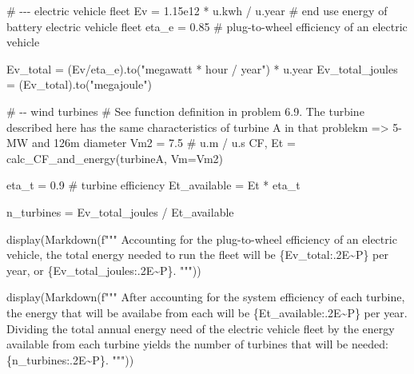 \documentclass[
  letterpaper,
  DIV=11,
  numbers=noendperiod]{scrartcl}
\newenvironment{Shaded}{\begin{snugshade}}{\end{snugshade}}
\newcommand{\CommentTok}[1]{\textcolor[rgb]{0.37,0.37,0.37}{#1}}
\newcommand{\ErrorTok}[1]{\textcolor[rgb]{0.68,0.00,0.00}{#1}}
\newcommand{\FloatTok}[1]{\textcolor[rgb]{0.68,0.00,0.00}{#1}}
\newcommand{\NormalTok}[1]{\textcolor[rgb]{0.00,0.23,0.31}{#1}}
\newcommand{\OperatorTok}[1]{\textcolor[rgb]{0.37,0.37,0.37}{#1}}
\newcommand{\SpecialCharTok}[1]{\textcolor[rgb]{0.37,0.37,0.37}{#1}}
\newcommand{\SpecialStringTok}[1]{\textcolor[rgb]{0.13,0.47,0.30}{#1}}
\newcommand{\StringTok}[1]{\textcolor[rgb]{0.13,0.47,0.30}{#1}}
\begin{document}
\begin{Shaded}
\begin{Highlighting}[]
\CommentTok{\# {-}{-}{-} electric vehicle fleet }
\NormalTok{Ev }\OperatorTok{=} \FloatTok{1.15e12} \OperatorTok{*}\NormalTok{ u.kwh }\OperatorTok{/}\NormalTok{ u.year }\CommentTok{\# end use energy of battery electric vehicle fleet }
\NormalTok{eta\_e }\OperatorTok{=} \FloatTok{0.85} \CommentTok{\# plug{-}to{-}wheel efficiency of an electric vehicle}

\NormalTok{Ev\_total }\OperatorTok{=}\NormalTok{ (Ev}\OperatorTok{/}\NormalTok{eta\_e).to(}\StringTok{"megawatt * hour / year"}\NormalTok{) }\OperatorTok{*}\NormalTok{ u.year}
\NormalTok{Ev\_total\_joules }\OperatorTok{=}\NormalTok{ (Ev\_total).to(}\StringTok{"megajoule"}\NormalTok{)}

\CommentTok{\# {-}{-} wind turbines }
\CommentTok{\# See function definition in problem 6.9. The turbine described here has the same characteristics of turbine A in that problekm =\textgreater{} 5{-}MW and 126m diameter }
\NormalTok{Vm2 }\OperatorTok{=} \FloatTok{7.5} \CommentTok{\# u.m / u.s}
\NormalTok{CF, Et }\OperatorTok{=}\NormalTok{ calc\_CF\_and\_energy(turbineA, Vm}\OperatorTok{=}\NormalTok{Vm2)}

\NormalTok{eta\_t }\OperatorTok{=} \FloatTok{0.9} \CommentTok{\# turbine efficiency }
\NormalTok{Et\_available }\OperatorTok{=}\NormalTok{ Et }\OperatorTok{*}\NormalTok{ eta\_t }

\NormalTok{n\_turbines }\OperatorTok{=}\NormalTok{ Ev\_total\_joules }\OperatorTok{/}\NormalTok{ Et\_available }

\NormalTok{display(Markdown(}\SpecialStringTok{f"""}
\SpecialStringTok{Accounting for the plug{-}to{-}wheel efficiency of an electric vehicle, the total energy needed to run the fleet will be }\SpecialCharTok{\{}\NormalTok{Ev\_total}\SpecialCharTok{:}\FloatTok{.2}\ErrorTok{E}\OperatorTok{\textasciitilde{}}\NormalTok{P}\SpecialCharTok{\}}\SpecialStringTok{ per year, or }\SpecialCharTok{\{}\NormalTok{Ev\_total\_joules}\SpecialCharTok{:}\FloatTok{.2}\ErrorTok{E}\OperatorTok{\textasciitilde{}}\NormalTok{P}\SpecialCharTok{\}}\SpecialStringTok{.}
\SpecialStringTok{"""}\NormalTok{))}

\NormalTok{display(Markdown(}\SpecialStringTok{f"""}
\SpecialStringTok{After accounting for the system efficiency of each turbine, the energy that will be availabe from each will be }\SpecialCharTok{\{}\NormalTok{Et\_available}\SpecialCharTok{:}\FloatTok{.2}\ErrorTok{E}\OperatorTok{\textasciitilde{}}\NormalTok{P}\SpecialCharTok{\}}\SpecialStringTok{ per year. Dividing the total annual energy need of the electric vehicle fleet by the energy available from each turbine yields the number of turbines that will be needed: }\SpecialCharTok{\{}\NormalTok{n\_turbines}\SpecialCharTok{:}\FloatTok{.2}\ErrorTok{E}\OperatorTok{\textasciitilde{}}\NormalTok{P}\SpecialCharTok{\}}\SpecialStringTok{.}
\SpecialStringTok{"""}\NormalTok{))}
\end{Highlighting}
\end{Shaded}
\end{document}
